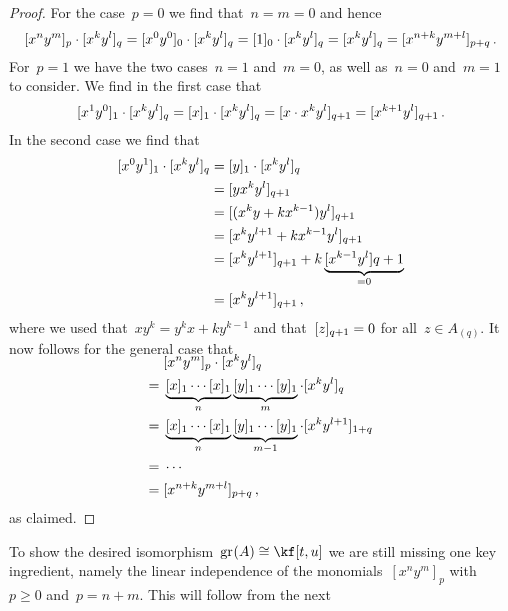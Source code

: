 \begin{proof}
	For the case~$p = 0$ we find that~$n = m = 0$ and hence
	\[
		\lbrack x^n y^m \rbrack_p \cdot \lbrack x^k y^l \rbrack_q
		=
		\lbrack x^0 y^0 \rbrack_0 \cdot \lbrack x^k y^l \rbrack_q
		=
		\lbrack 1 \rbrack_0 \cdot \lbrack x^k y^l \rbrack_q
		=
		\lbrack x^k y^l \rbrack_q
		=
		\lbrack x^{n+k} y^{m+l} \rbrack_{p+q} \,.
	\]
	For~$p = 1$ we have the two cases~$n = 1$ and~$m = 0$, as well as~$n = 0$ and~$m = 1$ to consider.
	We find in the first case that
	\[
		\lbrack x^1 y^0 \rbrack_1 \cdot \lbrack x^k y^l\rbrack_q
		=
		\lbrack x\rbrack_1 \cdot \lbrack x^k y^l \rbrack_q
		=
		\lbrack x \cdot x^k y^l\rbrack_{q+1}
		=
		\lbrack x^{k+1} y^l \rbrack_{q+1} \,.
	\]
	In the second case we find that
	\begin{align*}
		\lbrack x^0 y^1 \rbrack_1 \cdot \lbrack x^k y^l \rbrack_q
		&=
		\lbrack y\rbrack_1 \cdot \lbrack x^k y^l \rbrack_q
		\\
		&=
		\lbrack y x^k y^l \rbrack_{q+1}
		\\
		&=
		\lbrack (x^k y + k x^{k-1}) y^l \rbrack_{q+1}
		\\
		&=
		\lbrack x^k y^{l+1} + k x^{k-1} y^l \rbrack_{q+1}
		\\
		&=
		\lbrack x^k y^{l+1} \rbrack_{q+1} + k \underbrace{ \lbrack x^{k-1} y^l \rbrack{q+1} }_{=0}
		\\
		&=
		\lbrack x^k y^{l+1} \rbrack_{q+1} \,,
	\end{align*}
	where we used that~$x y^k = y^k x + k y^{k-1}$ and that~$\lbrack z \rbrack_{q+1} = 0$ for all~$z \in A_{(q)}$.
	It now follows for the general case that
	\begin{align*}
		\SwapAboveDisplaySkip
		{}&
		\fclass{ x^n y^m }_p \cdot \fclass{ x^k y^l }_q
		\\
		={}&
		\underbrace{ \fclass{x}_1 \dotsm \fclass{x}_1 }_{n}
		\underbrace{ \fclass{y}_1 \dotsm \fclass{y}_1 }_{m}
		\cdot
		\fclass{ x^k y^l }_q
		\\
		={}&
		\underbrace{ \fclass{x}_1 \dotsm \fclass{x}_1 }_{n}
		\underbrace{ \fclass{y}_1 \dotsm \fclass{y}_1 }_{m-1}
		\cdot
		\fclass{ x^k  y^{l+1} }_{1+q}
		\\
		={}&
		\dotsb
		\\
		={}&
		\fclass{ x^{n+k} y^{m+l} }_{p+q} \,,
	\end{align*}
	as claimed.
\end{proof}


\begin{fluff}
	To show the desired isomorphism~$\gr(A) \cong \kf[t,u]$ we are still missing one key ingredient, namely the linear independence of the monomials~$[x^n y^m]_p$ with~$p \geq 0$ and~$p = n+m$.
	This will follow from the next 
\end{fluff}

